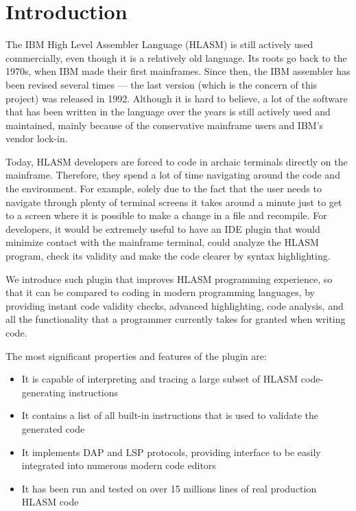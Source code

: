 \chapter{Introduction}

The IBM High Level Assembler Language (HLASM) is still actively used commercially, even though it is a relatively old language. Its roots go back to the 1970s, when IBM made their first mainframes. Since then, the IBM assembler has been revised several times --- the last version (which is the concern of this project) was released in 1992. Although it is hard to believe, a lot of the software that has been written in the language over the years is still actively used and maintained, mainly because of the conservative mainframe users and IBM's vendor lock-in.

Today, HLASM developers are forced to code in archaic terminals directly on the mainframe. Therefore, they spend a lot of time navigating around the code and the environment. For example, solely due to the fact that the user needs to navigate through plenty of terminal screens it takes around a minute just to get to a screen where it is possible to make a change in a file and recompile. For developers, it would be extremely useful to have an IDE plugin that would minimize contact with the mainframe terminal, could analyze the HLASM program, check its validity and make the code clearer by syntax highlighting. 

We introduce such plugin that improves HLASM programming experience, so that it can be compared to coding in modern programming languages, by providing instant code validity checks, advanced highlighting, code analysis, and all the functionality that a programmer currently takes for granted when writing code.

The most significant properties and features of the plugin are:
\begin{itemize}
	\item It is capable of interpreting and tracing a large subset of HLASM code-generating instructions
	\item It contains a list of all built-in instructions that is used to validate the generated code
	\item It implements DAP and LSP protocols, providing interface to be easily integrated into numerous modern code editors
	\item It has been run and tested on over 15 millions lines of real production HLASM code
\end{itemize}

